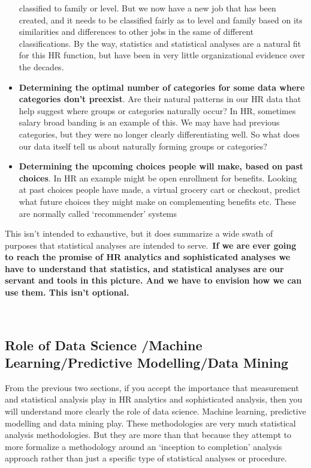 \documentclass[
]{article}
\begin{document}
\begin{itemize}
  classified to family or level. But we now have a new job that has been
  created, and it needs to be classified fairly as to level and family
  based on its similarities and differences to other jobs in the same of
  different classifications. By the way, statistics and statistical
  analyses are a natural fit for this HR function, but have been in very
  little organizational evidence over the decades.
\item
  \textbf{Determining the optimal number of categories for some data
  where categories don't preexist}. Are their natural patterns in our HR
  data that help suggest where groups or categories naturally occur? In
  HR, sometimes salary broad banding is an example of this. We may have
  had previous categories, but they were no longer clearly
  differentiating well. So what does our data itself tell us about
  naturally forming groups or categories?
\item
  \textbf{Determining the upcoming choices people will make, based on
  past choices}. In HR an example might be open enrollment for benefits.
  Looking at past choices people have made, a virtual grocery cart or
  checkout, predict what future choices they might make on complementing
  benefits etc. These are normally called `recommender' systems
\end{itemize}

This isn't intended to exhaustive, but it does summarize a wide swath of
purposes that statistical analyses are intended to serve.~\textbf{If we
are ever going to reach the promise of HR analytics and sophisticated
analyses we have to understand that statistics, and statistical analyses
are our servant and tools in this picture. And we have to envision how
we can use them. This isn't optional.}

~

\subsection{\texorpdfstring{\textbf{Role of Data Science /Machine
Learning/Predictive Modelling/Data
Mining}}{Role of Data Science /Machine Learning/Predictive Modelling/Data Mining}}\label{role-of-data-science-machine-learningpredictive-modellingdata-mining}

From the previous two sections, if you accept the importance that
measurement and statistical analysis play in HR analytics and
sophisticated analysis, then you will understand more clearly the role
of data science. Machine learning, predictive modelling and data mining
play. These methodologies are very much statistical analysis
methodologies. But they are more than that because they attempt to more
formalize a methodology around an `inception to completion' analysis
approach rather than just a specific type of statistical analyses or
procedure.
\end{document}
